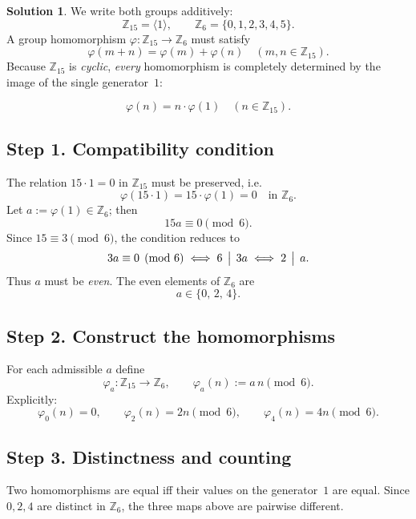 \documentclass[12pt]{article}
\theoremstyle{definition} %
\newtheorem{solution}{Solution}
\theoremstyle{plain} %
\begin{document}
                        \begin{solution}
We write both groups additively:
\[
   \mathbb{Z}_{15}=\bigl\langle 1\bigr\rangle,
   \qquad
   \mathbb{Z}_{6}=\{0,1,2,3,4,5\}.
\]
A group homomorphism $\varphi:\mathbb{Z}_{15}\to\mathbb{Z}_{6}$ must satisfy
\[
   \varphi(m+n)=\varphi(m)+\varphi(n)\quad
   (m,n\in\mathbb{Z}_{15}).
\]
Because $\mathbb{Z}_{15}$ is \emph{cyclic}, \emph{every} homomorphism is completely
determined by the image of the single generator~$1$:

\[
      \boxed{\;
      \varphi(n)=n\cdot\varphi(1)\quad(n\in\mathbb{Z}_{15}).
      \;}
\]

\subsection*{Step 1.  Compatibility condition}

The relation $15\cdot 1=0$ in $\mathbb{Z}_{15}$ must be preserved, i.e. 
\[
      \varphi(15\cdot 1)=15\cdot\varphi(1)=0\quad\text{in }\mathbb{Z}_{6}.
\]
Let $a:=\varphi(1)\in\mathbb{Z}_{6}$; then
\[
      15a\equiv 0 \pmod{6}.
\]
Since $15\equiv 3\pmod 6$, the condition reduces to
\[
      3a\equiv 0\pmod 6
      \;\Longleftrightarrow\;
      6\,\bigm|\,3a
      \;\Longleftrightarrow\;
      2\,\bigm|\,a.
\]
Thus $a$ must be \emph{even}.  The even elements of $\mathbb{Z}_{6}$ are
\[
      a\in\{0,\,2,\,4\}.
\]

\subsection*{Step 2.  Construct the homomorphisms}

For each admissible $a$ define
\[
     \varphi_{a} : \mathbb{Z}_{15}\longrightarrow \mathbb{Z}_{6},
     \qquad
     \varphi_{a}(n):=a\,n\pmod 6.
\]
Explicitly:
\[
   \varphi_{0}(n)=0,   \qquad
   \varphi_{2}(n)=2n\pmod 6, \qquad
   \varphi_{4}(n)=4n\pmod 6.
\]

\subsection*{Step 3.  Distinctness and counting}

Two homomorphisms are equal iff their values on the generator~$1$ are
equal.  Since $0,2,4$ are distinct in $\mathbb{Z}_{6}$, the three maps above are
pairwise different.


\end{solution}
\end{document}
